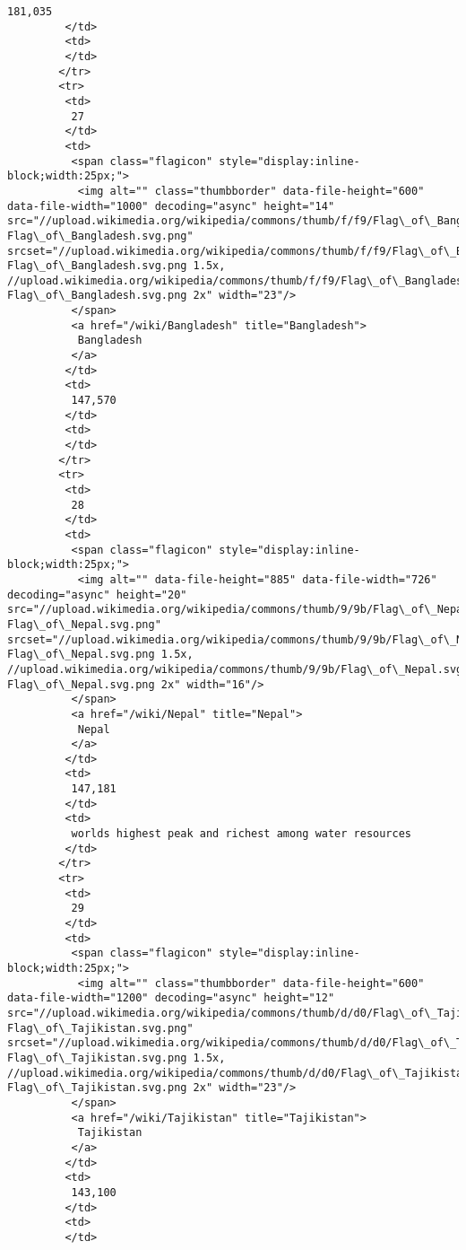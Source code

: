\documentclass[11pt]{article}
\begin{document}
\begin{Verbatim}[commandchars=\\\{\}]
          181,035
         </td>
         <td>
         </td>
        </tr>
        <tr>
         <td>
          27
         </td>
         <td>
          <span class="flagicon" style="display:inline-block;width:25px;">
           <img alt="" class="thumbborder" data-file-height="600" data-file-width="1000" decoding="async" height="14" src="//upload.wikimedia.org/wikipedia/commons/thumb/f/f9/Flag\_of\_Bangladesh.svg/23px-Flag\_of\_Bangladesh.svg.png" srcset="//upload.wikimedia.org/wikipedia/commons/thumb/f/f9/Flag\_of\_Bangladesh.svg/35px-Flag\_of\_Bangladesh.svg.png 1.5x, //upload.wikimedia.org/wikipedia/commons/thumb/f/f9/Flag\_of\_Bangladesh.svg/46px-Flag\_of\_Bangladesh.svg.png 2x" width="23"/>
          </span>
          <a href="/wiki/Bangladesh" title="Bangladesh">
           Bangladesh
          </a>
         </td>
         <td>
          147,570
         </td>
         <td>
         </td>
        </tr>
        <tr>
         <td>
          28
         </td>
         <td>
          <span class="flagicon" style="display:inline-block;width:25px;">
           <img alt="" data-file-height="885" data-file-width="726" decoding="async" height="20" src="//upload.wikimedia.org/wikipedia/commons/thumb/9/9b/Flag\_of\_Nepal.svg/16px-Flag\_of\_Nepal.svg.png" srcset="//upload.wikimedia.org/wikipedia/commons/thumb/9/9b/Flag\_of\_Nepal.svg/25px-Flag\_of\_Nepal.svg.png 1.5x, //upload.wikimedia.org/wikipedia/commons/thumb/9/9b/Flag\_of\_Nepal.svg/33px-Flag\_of\_Nepal.svg.png 2x" width="16"/>
          </span>
          <a href="/wiki/Nepal" title="Nepal">
           Nepal
          </a>
         </td>
         <td>
          147,181
         </td>
         <td>
          worlds highest peak and richest among water resources
         </td>
        </tr>
        <tr>
         <td>
          29
         </td>
         <td>
          <span class="flagicon" style="display:inline-block;width:25px;">
           <img alt="" class="thumbborder" data-file-height="600" data-file-width="1200" decoding="async" height="12" src="//upload.wikimedia.org/wikipedia/commons/thumb/d/d0/Flag\_of\_Tajikistan.svg/23px-Flag\_of\_Tajikistan.svg.png" srcset="//upload.wikimedia.org/wikipedia/commons/thumb/d/d0/Flag\_of\_Tajikistan.svg/35px-Flag\_of\_Tajikistan.svg.png 1.5x, //upload.wikimedia.org/wikipedia/commons/thumb/d/d0/Flag\_of\_Tajikistan.svg/46px-Flag\_of\_Tajikistan.svg.png 2x" width="23"/>
          </span>
          <a href="/wiki/Tajikistan" title="Tajikistan">
           Tajikistan
          </a>
         </td>
         <td>
          143,100
         </td>
         <td>
         </td>

\end{Verbatim}
\end{document}
